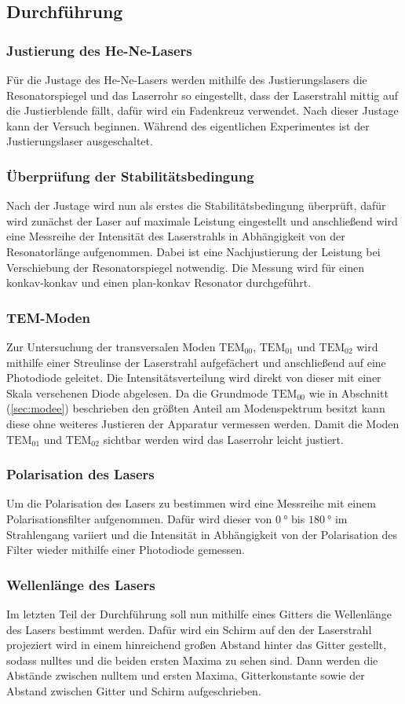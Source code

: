 \subsection{Durchführung}
\subsubsection{Justierung des He-Ne-Lasers}
Für die Justage des He-Ne-Lasers werden mithilfe des Justierungslasers die Resonatorspiegel und das Laserrohr so eingestellt, dass der Laserstrahl mittig auf die Justierblende fällt, dafür wird ein Fadenkreuz verwendet.
Nach dieser Justage kann der Versuch beginnen. Während des eigentlichen Experimentes ist der Justierungslaser ausgeschaltet.
\subsubsection{Überprüfung der Stabilitätsbedingung}
Nach der Justage wird nun als erstes die Stabilitätsbedingung überprüft, dafür wird zunächst der Laser auf maximale Leistung eingestellt und anschließend wird eine Messreihe der Intensität des Laserstrahls in Abhängigkeit von
der Resonatorlänge aufgenommen. Dabei ist eine Nachjustierung der Leistung bei Verschiebung der Resonatorspiegel notwendig. Die Messung wird für einen konkav-konkav und einen plan-konkav Resonator durchgeführt.
\subsubsection{TEM-Moden}
Zur Untersuchung der transversalen Moden $\mathrm{TEM}_\mathrm{00}$, $\mathrm{TEM}_\mathrm{01}$ und $\mathrm{TEM}_\mathrm{02}$ wird mithilfe einer Streulinse der Laserstrahl aufgefächert und anschließend auf eine Photodiode geleitet.
Die Intensitätsverteilung wird direkt von dieser mit einer Skala versehenen Diode abgelesen. Da die Grundmode $\mathrm{TEM}_\mathrm{00}$ wie in Abschnitt (\ref{sec:modee}) beschrieben den größten Anteil am Modenspektrum besitzt kann
diese ohne weiteres Justieren der Apparatur vermessen werden. Damit die Moden $\mathrm{TEM}_\mathrm{01}$ und $\mathrm{TEM}_\mathrm{02}$ sichtbar werden wird das Laserrohr leicht justiert.
\subsubsection{Polarisation des Lasers}
\label{sec:polari}
Um die Polarisation des Lasers zu bestimmen wird eine Messreihe mit einem Polarisationsfilter aufgenommen. Dafür wird dieser von $\SI{0}{\degree}$ bis $\SI{180}{\degree}$ im Strahlengang variiert und die Intensität in Abhängigkeit von der Polarisation des Filter wieder mithilfe einer Photodiode gemessen.
\subsubsection{Wellenlänge des Lasers}
Im letzten Teil der Durchführung soll nun mithilfe eines Gitters die Wellenlänge des Lasers bestimmt werden. Dafür wird ein Schirm auf den der Laserstrahl projeziert wird in einem hinreichend großen Abstand hinter das Gitter gestellt, sodass nulltes und die beiden ersten Maxima zu sehen sind. Dann werden die Abstände zwischen nulltem und ersten Maxima, Gitterkonstante sowie der Abstand zwischen Gitter und Schirm aufgeschrieben.
